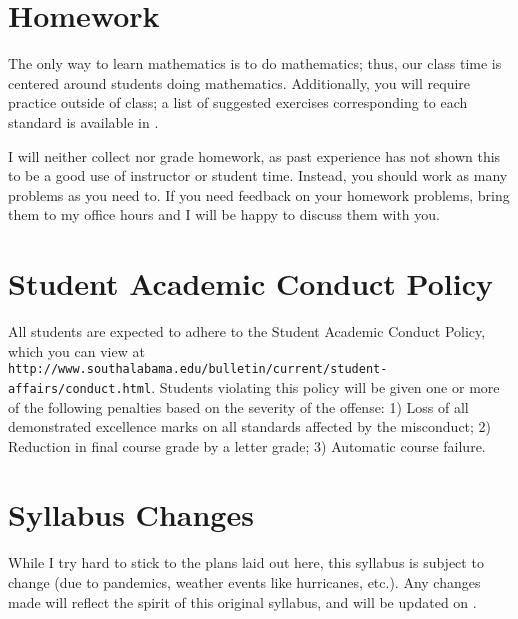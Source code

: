 \documentclass{article}
\begin{document}
\section*{\fontsize{12}{15}\selectfont Homework}
The only way to learn mathematics is to do mathematics; thus, our class time is centered around students doing mathematics.  Additionally, you will require practice outside of class; a list of suggested exercises corresponding to each standard is available in \LMS. 

I will neither collect nor grade homework, as past experience has not shown this to be a good use of instructor or student time.  Instead, you should work as many problems as you need to. If you need feedback on your homework problems, bring them to my office hours and I will be happy to discuss them with you.


\section*{\fontsize{12}{15}\selectfont Student Academic Conduct Policy}
All students are expected to adhere to the Student Academic Conduct Policy, which you can view at
{\tt http://www.southalabama.edu/bulletin/current/student-affairs/conduct.html}.  Students violating this policy will be given one or more of the following penalties based on the severity of the offense:  1) Loss of all demonstrated excellence marks on all standards affected by the misconduct; 2) Reduction in final course grade by a letter grade; 3) Automatic course failure.


\section*{\fontsize{12}{15}\selectfont Syllabus Changes}
While I try hard to stick to the plans laid out here, this syllabus is subject to change (due to pandemics, weather events like hurricanes, etc.). Any changes made will reflect the spirit of this original syllabus, and will be updated on \LMS.
\end{document}
